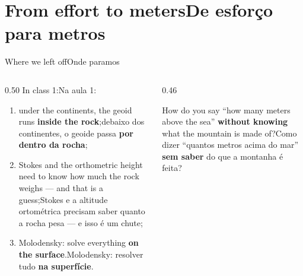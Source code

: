 \documentclass[aspectratio=169,11pt]{beamer}
\newcommand{\tr}[2]{\ifEN#2\else#1\fi}
\newcommand{\bnum}[1]{\textbf{\textcolor{mTeal}{#1}}}
\begin{document}
\section{\tr{De esforço para metros}{From effort to meters}}

\begin{frame}{\tr{Onde paramos}{Where we left off}}
  \begin{columns}[T]
    \begin{column}{0.50\textwidth}
      \tr{Na aula 1:}{In class 1:}
      \begin{enumerate}
        \setlength{\itemsep}{4pt}
        \item \tr{debaixo dos continentes, o geoide passa \bnum{por dentro da rocha};}{under
              the continents, the geoid runs \bnum{inside the rock};}
        \item \tr{Stokes e a altitude ortométrica precisam saber \alert{quanto a rocha pesa}
              --- e isso é um chute;}{Stokes and the orthometric height need to know \alert{how
              much the rock weighs} --- and that is a guess;}
        \item \tr{Molodensky: resolver tudo \bnum{na superfície}.}{Molodensky: solve everything
              \bnum{on the surface}.}
      \end{enumerate}
    \end{column}
    \begin{column}{0.46\textwidth}
      \begin{ideia}[title={\tr{A pergunta de hoje, em uma linha}{Today's question, in one
        line}}]
        \tr{Como dizer ``quantos metros acima do mar'' \bnum{sem saber} do que a montanha é
        feita?}{How do you say ``how many meters above the sea'' \bnum{without knowing} what
        the mountain is made of?}
      \end{ideia}
    \end{column}
  \end{columns}
\end{frame}
\end{document}
